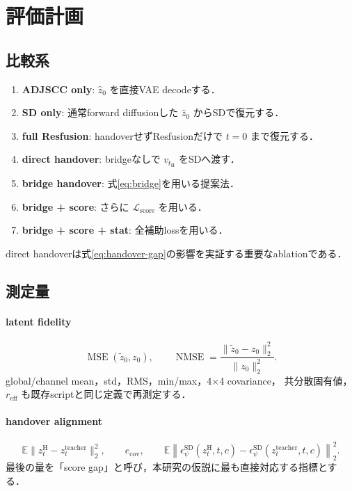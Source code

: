 \documentclass[11pt,a4paper]{ltjsarticle}
\newcommand{\E}{\mathbb{E}}
\newcommand{\mse}{\operatorname{MSE}}
\begin{document}
\section{評価計画}

\subsection{比較系}

\begin{enumerate}
  \item \textbf{ADJSCC only}: \(\hat z_0\) を直接VAE decodeする．
  \item \textbf{SD only}: 通常forward diffusionした \(\hat z_0\) からSDで復元する．
  \item \textbf{full Resfusion}: handoverせずResfusionだけで \(t=0\) まで復元する．
  \item \textbf{direct handover}: bridgeなしで \(v_{t_{\mathrm H}}\) をSDへ渡す．
  \item \textbf{bridge handover}: 式\eqref{eq:bridge}を用いる提案法．
  \item \textbf{bridge + score}: さらに \(\mathcal L_{\mathrm{score}}\) を用いる．
  \item \textbf{bridge + score + stat}: 全補助lossを用いる．
\end{enumerate}
direct handoverは式\eqref{eq:handover-gap}の影響を実証する重要なablationである．

\subsection{測定量}

\paragraph{latent fidelity}
\[
  \mse(\tilde z_0,z_0),\qquad
  \operatorname{NMSE}
  =
  \frac{\lVert\tilde z_0-z_0\rVert_2^2}
       {\lVert z_0\rVert_2^2}.
\]
global/channel mean，std，RMS，min/max，4\(\times\)4 covariance，
共分散固有値，\(r_{\mathrm{eff}}\) も既存scriptと同じ定義で再測定する．

\paragraph{handover alignment}
\[
  \E\lVert z_t^{\mathrm H}-z_t^{\mathrm{teacher}}\rVert_2^2,\qquad
  e_{\mathrm{cov}},\qquad
  \E\left\lVert
    \epsilon_\psi^{\mathrm{SD}}(z_t^{\mathrm H},t,c)
    -
    \epsilon_\psi^{\mathrm{SD}}(z_t^{\mathrm{teacher}},t,c)
  \right\rVert_2^2 .
\]
最後の量を「score gap」と呼び，本研究の仮説に最も直接対応する指標とする．
\end{document}
